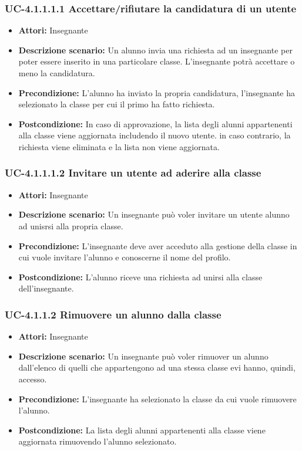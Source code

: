 \subsubsection{UC-4.1.1.1.1 Accettare/rifiutare la candidatura di un utente}
\begin{itemize}
		\item \textbf{Attori: } Insegnante
		\item \textbf{Descrizione scenario: } Un alunno invia una richiesta ad un insegnante per poter essere inserito in una particolare classe. L'insegnante potrà accettare o meno la candidatura.
		\item \textbf{Precondizione: } L'alunno ha inviato la propria candidatura, l'insegnante ha selezionato la classe per cui il primo ha fatto richiesta.
		\item \textbf{Postcondizione: } In caso di approvazione, la lista degli alunni appartenenti alla classe viene aggiornata includendo il nuovo utente. in caso contrario, la richiesta viene eliminata e la lista non viene aggiornata.
	\end{itemize}
\subsubsection{UC-4.1.1.1.2 Invitare un utente ad aderire alla classe}
\begin{itemize}
		\item \textbf{Attori: } Insegnante
		\item \textbf{Descrizione scenario: } Un insegnante può voler invitare un utente alunno ad unisrsi alla propria classe.
		\item \textbf{Precondizione: }  L'insegnante deve aver acceduto alla gestione della classe in cui vuole invitare l'alunno e conoscerne il nome del profilo. 
		\item \textbf{Postcondizione: } L'alunno riceve una richiesta ad unirsi alla classe dell'insegnante.
	\end{itemize}
\subsubsection{UC-4.1.1.2 Rimuovere un alunno dalla classe}
\begin{itemize}
		\item \textbf{Attori: } Insegnante
		\item \textbf{Descrizione scenario: } Un insegnante può voler rimuover un alunno dall'elenco di quelli che appartengono ad una stessa classe evi hanno, quindi, accesso.
		\item \textbf{Precondizione: }  L'insegnante ha selezionato la classe da cui vuole rimuovere l'alunno.
		\item \textbf{Postcondizione: } La lista degli alunni appartenenti alla classe viene aggiornata rimuovendo l'alunno selezionato.
	\end{itemize}

